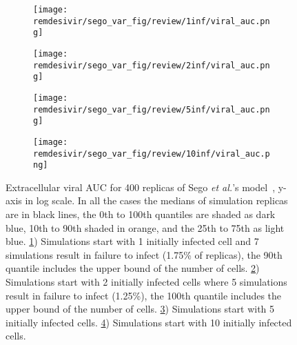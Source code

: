 \begin{figure}[H]

  \begin{subfigure}[b]{0.48\linewidth}
    \centering
    \texttt{[image: remdesivir/sego\_var\_fig/review/1inf/viral\_auc.png]} 
    \caption{} 
    \label{fig:res:var_sego:auc:1inf} 
  \end{subfigure} 
  \hspace{\fill}  %
  \begin{subfigure}[b]{0.48\linewidth}
    \centering
    \texttt{[image: remdesivir/sego\_var\_fig/review/2inf/viral\_auc.png]} 
    \caption{} 
    \label{fig:res:var_sego:auc:2inf} 
  \end{subfigure} 


    \vspace{4ex}
  \begin{subfigure}[b]{0.48\linewidth}
    \centering
    \texttt{[image: remdesivir/sego\_var\_fig/review/5inf/viral\_auc.png]} 
    \caption{} 
    \label{fig:res:var_sego:auc:5inf} 
  \end{subfigure} 
  \hspace{\fill}
  \begin{subfigure}[b]{0.48\linewidth}
    \centering
    \texttt{[image: remdesivir/sego\_var\_fig/review/10inf/viral\_auc.png]} 
    \caption{} 
    \label{fig:res:var_sego:auc:10inf} 
  \end{subfigure} 
\caption{Extracellular viral AUC for 400 replicas of Sego \emph{et al.}'s model~\cite{sego_modular_2020}, y-axis in log scale. In all the cases the medians of simulation replicas are in black lines, the 0th to 100th quantiles are shaded as dark blue, 10th to 90th shaded in orange, and the 25th to 75th as light blue. \ref{fig:res:var_sego:auc:1inf}) Simulations start with 1 initially infected cell and 7 simulations result in failure to infect (1.75\% of replicas), the 90th quantile includes the upper bound of the number of cells. \ref{fig:res:var_sego:auc:2inf}) Simulations start with 2 initially infected cells where 5 simulations result in failure to infect (1.25\%), the 100th quantile includes the upper bound of the number of cells. \ref{fig:res:var_sego:auc:5inf}) Simulations start with 5 initially infected cells. \ref{fig:res:var_sego:auc:10inf}) Simulations start with 10 initially infected cells.}\label{fig:res:var_sego:auc} 
\end{figure}


